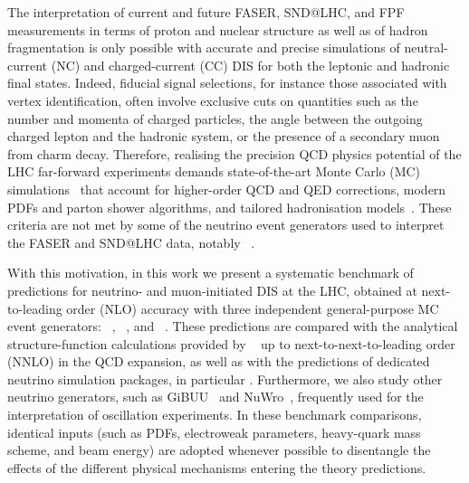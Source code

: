 The interpretation of current and future FASER, SND@LHC, and FPF measurements in terms of proton and nuclear structure as well as of hadron fragmentation is only possible with accurate and precise simulations of neutral-current (NC) and charged-current (CC) DIS for both the leptonic and hadronic final states.
%
Indeed, fiducial signal selections, for instance those associated with vertex identification, often involve exclusive cuts on quantities such as the number and momenta of charged particles, the angle between the outgoing charged lepton and the hadronic system, or the presence of a secondary muon from charm decay.
%
Therefore, realising the precision QCD physics potential of the LHC far-forward experiments demands state-of-the-art Monte Carlo (MC) simulations~\cite{Buckley:2011ms,Campbell:2022qmc} that account for higher-order QCD and QED corrections, modern PDFs and parton shower algorithms, and tailored hadronisation models~\cite{Skands:2014pea,Fieg:2023kld}.
%
These criteria are not met by some of the neutrino event generators used to interpret the FASER and SND@LHC data, notably \genie~\cite{Andreopoulos:2009rq,Andreopoulos:2015wxa,NuSTEC:2017hzk}.

With this motivation, in this work we present a systematic benchmark of predictions for neutrino- and muon-initiated DIS at the LHC, obtained at next-to-leading order (NLO) accuracy with three independent general-purpose MC event generators: \sherpa~\cite{Sherpa:2019gpd,Bothmann:2024}, \powheg~\cite{Nason:2004rx,Frixione:2007vw,Alioli:2010xd,Banfi:2023mhz,Buonocore:2024pdv,vanBeekveld:2024ziz,FerrarioRavasio:2024kem}, and \herwig~\cite{Bellm:2015jjp,Bewick:2023tfi}.
 These predictions are compared with the analytical structure-function calculations provided by \yadism~\cite{Candido:2024rkr,Candido:2023utz} up to next-to-next-to-leading order (NNLO) in the QCD expansion, as well as with the predictions of dedicated neutrino simulation packages, in particular \genie.
 Furthermore, we also study other neutrino generators, such as
 {\sc\small GiBUU}~\cite{Buss:2011mx} and {\sc\small NuWro}~\cite{Golan:2012rfa,Juszczak:2009qa}, frequently used for the interpretation of oscillation experiments. 
 In these benchmark comparisons, identical inputs (such as PDFs, electroweak parameters, heavy-quark mass scheme, and  beam energy) are adopted whenever possible to disentangle the effects of the different physical mechanisms entering the theory predictions.
 
